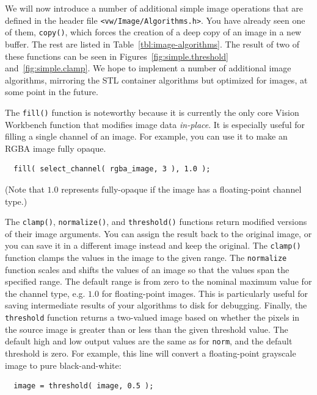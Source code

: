 We will now introduce a number of additional simple image operations
that are defined in the header file \verb#<vw/Image/Algorithms.h>#.
You have already seen one of them, \verb#copy()#, which forces the
creation of a deep copy of an image in a new buffer.  The rest are
listed in Table~\ref{tbl:image-algorithms}.  The result of two of
these functions can be seen in Figures~\ref{fig:simple.threshold}
and~\ref{fig:simple.clamp}.  We hope to implement a number of
additional image algorithms, mirroring the STL container algorithms
but optimized for images, at some point in the future.

The \verb#fill()# function is noteworthy because it is currently the
only core Vision Workbench function that modifies image data {\it
  in-place}.  It is especially useful for filling a single channel of
an image.  For example, you can use it to make an RGBA image fully
opaque.
\begin{verbatim}
  fill( select_channel( rgba_image, 3 ), 1.0 );
\end{verbatim}
(Note that $1.0$ represents fully-opaque if the image has a
floating-point channel type.)

The \verb#clamp()#, \verb#normalize()#, and \verb#threshold()#
functions return modified versions of their image arguments.
You can assign the result back to the original image, or you can
save it in a different image instead and keep the original.
The \verb#clamp()# function clamps the values in the image to
the given range.  The \verb#normalize# function scales and
shifts the values of an image so that the values span the
specified range.  The default range is from zero to the nominal
maximum value for the channel type, e.g. $1.0$ for floating-point
images.  This is particularly useful for saving intermediate
results of your algorithms to disk for debugging.  Finally, the
\verb#threshold# function returns a two-valued image based on
whether the pixels in the source image is greater than or less
than the given threshold value.  The default high and low output
values are the same as for \verb#norm#, and the default threshold
is zero.  For example, this line will convert a floating-point
grayscale image to pure black-and-white:
\begin{verbatim}
  image = threshold( image, 0.5 );
\end{verbatim}

